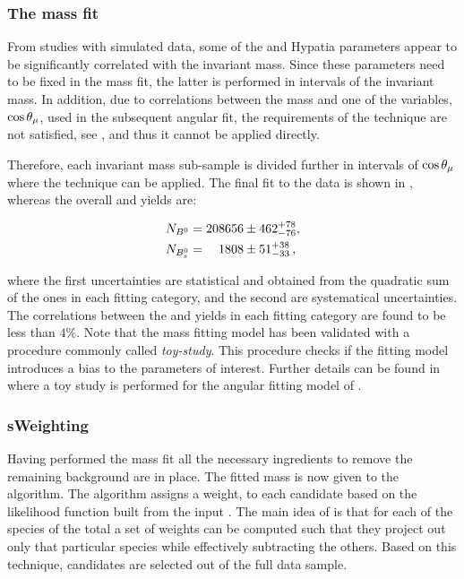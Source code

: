 \subsubsection{The mass fit}
From studies with simulated data, some of the \Bs and \Bd Hypatia parameters appear to be significantly correlated with the \mkpi invariant mass.
Since these parameters need to be fixed in the mass fit, the latter is performed in intervals of the
\mkpi invariant mass. In addition, due to correlations between the mass and one of the variables, $\cos\theta_{\mu}$, used in
the subsequent angular fit, the requirements of the \sPlot technique are not satisfied, see , 
and thus it cannot be applied directly.

Therefore, each \mkpi invariant mass sub-sample is divided further in intervals of $\cos\theta_{\mu}$ where the \sPlot technique
can be applied. The final fit to the data is shown in , whereas the overall \Bs and \Bd yields are:

\begin{align}
  \centering
  N_{\Bd} &= 208656  \pm  462 ^{+ 78}_{-76}, \\
  N_{\Bs} &= \phantom{00}1808  \pm  51 ^{+ 38}_{-33} \, ,
  \label{signal_yields}
\end{align}

\noindent where the first uncertainties are statistical and obtained from the quadratic sum of the ones in each fitting category,
and the second are systematical uncertainties. The correlations between the \Bd and \Bs yields in each fitting category
are found to be less than $4\%$. Note that the mass fitting model has been validated with a procedure commonly called {\it toy-study}.
This procedure checks if the fitting model introduces a bias to the parameters of interest. Further details can be found in
 where a toy study is performed for the angular fitting model of .

\subsubsection{sWeighting}
Having performed the mass fit all the necessary ingredients to remove the remaining background are in place.
The fitted mass \pdf is now given to the \sPlot algorithm. The algorithm assigns a weight, to each candidate
based on the likelihood function built from the input \pdf. The main idea of \sPlot is that for each of the 
species of the total \pdf a set of weights can be computed such that they project out only that particular 
species while effectively subtracting the others. Based on this technique, \BsJpsiKst candidates are selected 
out of the full data sample.

